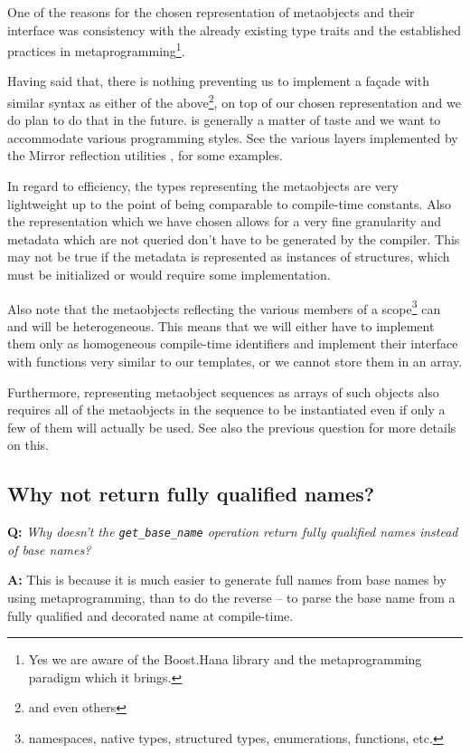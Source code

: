 One of the reasons for the chosen representation of metaobjects and their
interface was consistency with the already existing type traits and the
established practices in metaprogramming\footnote{Yes we are aware of the
Boost.Hana library and the metaprogramming paradigm which it brings.}.

Having said that, there is nothing preventing us to implement a fa\c{c}ade
with similar syntax as either of the above\footnote{and even others}, on top
of our chosen representation and we do plan to do that in the future.
 is generally a matter of taste and we want to accommodate
various programming styles. See the various layers implemented by the Mirror
reflection utilities \cite{Chochlik-Mirror-new-doc},
\cite{Chochlik-Mirror-old-doc} for some examples.

In regard to efficiency, the types representing the metaobjects are very
lightweight up to the point of being comparable to compile-time constants.
Also the representation which we have chosen allows for a very fine granularity
and metadata which are not queried don't have to be generated by the compiler.
This may not be true if the metadata is represented as instances of \verb@constexpr@
structures, which must be initialized or would require some 
implementation.

Also note that the metaobjects reflecting the various members of a scope\footnote{
namespaces, native types, structured types, enumerations, functions, etc.}
can and will be heterogeneous. This means that we will either have to implement
them only as homogeneous compile-time identifiers and implement their interface
with  \verb@constexpr@ functions very similar to our templates, or
we cannot store them in an array.

Furthermore, representing metaobject sequences as arrays of such \verb@constexpr@
objects also requires all of the metaobjects in the sequence to be instantiated
even if only a few of them will actually be used. See also the previous
question for more details on this.

\subsection{Why not return fully qualified names?}

\textbf{Q:} {\em Why doesn't the \texttt{get\_base\_name} operation return fully
qualified names instead of base names?}

\textbf{A:} This is because it is much easier to generate full names from
base names by using metaprogramming, than to do the reverse -- to parse the
base name from a fully qualified and decorated name at compile-time.

